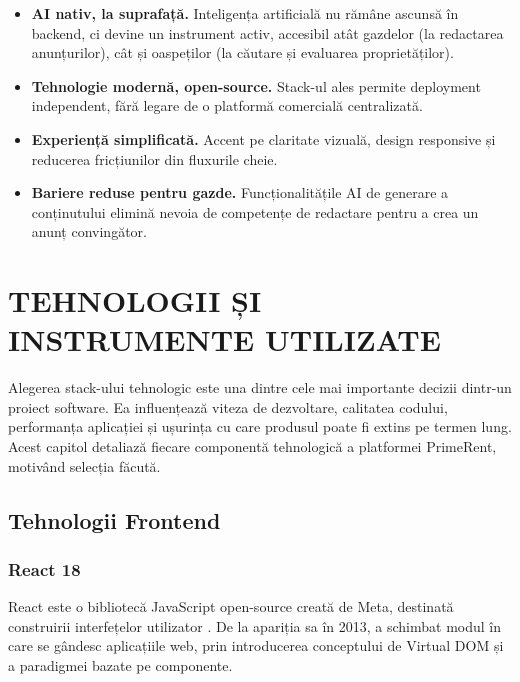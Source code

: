 \documentclass[12pt,a4paper,oneside]{report}
\begin{document}
\begin{itemize}
  \item \textbf{AI nativ, la suprafață.} Inteligența artificială nu rămâne ascunsă în backend, ci devine un instrument activ, accesibil atât gazdelor (la redactarea anunțurilor), cât și oaspeților (la căutare și evaluarea proprietăților).
  \item \textbf{Tehnologie modernă, open-source.} Stack-ul ales permite deployment independent, fără legare de o platformă comercială centralizată.
  \item \textbf{Experiență simplificată.} Accent pe claritate vizuală, design responsive și reducerea fricțiunilor din fluxurile cheie.
  \item \textbf{Bariere reduse pentru gazde.} Funcționalitățile AI de generare a conținutului elimină nevoia de competențe de redactare pentru a crea un anunț convingător.
\end{itemize}


\chapter{TEHNOLOGII ȘI INSTRUMENTE UTILIZATE}

Alegerea stack-ului tehnologic este una dintre cele mai importante decizii dintr-un proiect software. Ea influențează viteza de dezvoltare, calitatea codului, performanța aplicației și ușurința cu care produsul poate fi extins pe termen lung. Acest capitol detaliază fiecare componentă tehnologică a platformei PrimeRent, motivând selecția făcută.

\section{Tehnologii Frontend}

\subsection{React 18}

React este o bibliotecă JavaScript open-source creată de Meta, destinată construirii interfețelor utilizator \cite{react}. De la apariția sa în 2013, a schimbat modul în care se gândesc aplicațiile web, prin introducerea conceptului de Virtual DOM și a paradigmei bazate pe componente.
\end{document}
